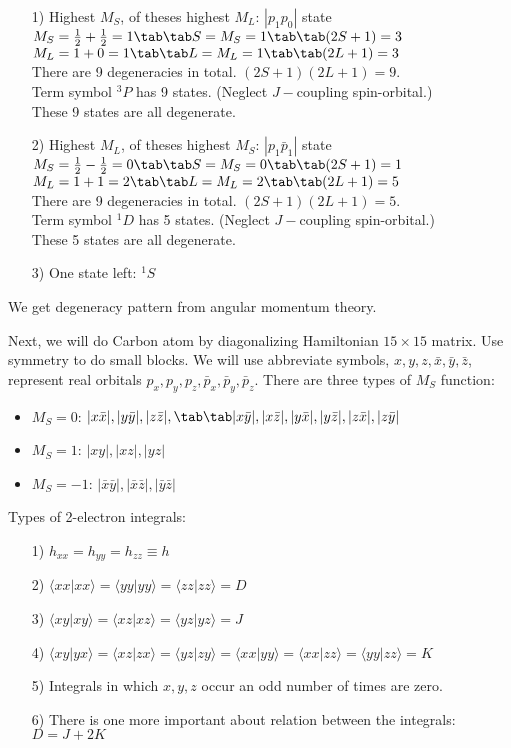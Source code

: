 \documentclass[a4paper, 12pt]{article}
\begin{document}
\begin{itemize}
	\item [1)] Highest $M_S$, of theses highest $M_L$: $|p_1p_0|$ state \\
	$M_S =\frac{1}{2}+\frac{1}{2}=1 \tab\tab S=M_S=1 \tab\tab (2S+1)=3$\\
	$ M_L= 1+0=1  \tab\tab L=M_L=1 \tab\tab (2L+1)=3$\\
	There are 9 degeneracies in total. $(2S+1)(2L+1)=9$.\\
	Term symbol $^3P$ has 9 states. (Neglect $J-$coupling spin-orbital.)\\
	These 9 states are all degenerate.
	\item [2)] Highest $M_L$, of theses highest $M_S$: $|p_1\bar{p}_1|$ state
	\\
	$M_S =\frac{1}{2}-\frac{1}{2}=0 \tab\tab S=M_S=0 \tab\tab (2S+1)=1$\\
	$ M_L= 1+1=2  \tab\tab L=M_L=2 \tab\tab (2L+1)=5$\\
	There are 9 degeneracies in total. $(2S+1)(2L+1)=5$.\\
	Term symbol $^1D$ has 5 states. (Neglect $J-$coupling spin-orbital.)\\
	These 5 states are all degenerate.
	\item [3)] One state left: $^1S$
\end{itemize}
\tab We get degeneracy pattern from angular momentum theory.

Next, we will do Carbon atom by diagonalizing Hamiltonian $15 \times 15$ matrix. Use symmetry to do small blocks. We will use abbreviate symbols, $x,y,z,\bar{x},\bar{y},\bar{z}$, represent real orbitals $p_x,p_y,p_z, \bar{p}_x,\bar{p}_y,\bar{p}_z$. There are three types of $M_S$ function: 
\begin{itemize}
	\item $M_S=0$: $|x\bar{x}|, |y\bar{y}|, |z\bar{z}|, \\ \tab \tab |x\bar{y}|, |x\bar{z}|, |y\bar{x}|, |y\bar{z}|,|z\bar{x}|, |z\bar{y}|$
	\item $M_S=1$: $|xy|, |xz|, |yz|$
	\item $M_S=-1$: $|\bar{x}\bar{y}|,|\bar{x}\bar{z}|, |\bar{y}\bar{z}|$
\end{itemize}
 Types of 2-electron integrals: 
\begin{itemize}
	\item[1)] $h_{xx}=h_{yy}=h_{zz}\equiv h$
	\item[2)] $\langle xx|xx \rangle = \langle yy|yy\rangle =\langle zz|zz\rangle =D $
	\item[3)] $\langle xy|xy \rangle = \langle xz|xz\rangle =\langle yz|yz\rangle =J $
	\item[4)] $\langle xy|yx \rangle = \langle xz|zx\rangle =\langle yz|zy\rangle = \langle xx|yy \rangle = \langle xx|zz\rangle =\langle yy|zz\rangle =K$ 
	\item[5)] Integrals in which $x,y,z$ occur an odd number of times are zero. 
	\item[6)] There is one more important about relation between the integrals:  $D=J+2K$
	
\end{itemize}
\end{document}
